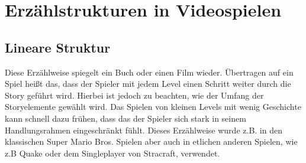 %
%
%
%
%
%
%
%
%
%
%
%
%
%
%
\section{Erzählstrukturen in Videospielen} 
 

\subsection{Lineare Struktur} 

Diese Erzählweise spiegelt ein Buch oder einen Film wieder. Übertragen auf ein Spiel heißt das, dass der Spieler mit jedem Level einen Schritt weiter durch die Story geführt wird. Hierbei ist jedoch zu beachten, wie der Umfang der Storyelemente gewählt wird. Das Spielen von kleinen Levels mit wenig Geschichte kann schnell dazu frühen, dass das der Spieler sich stark in seinem Handlungsrahmen eingeschränkt fühlt.  Dieses Erzählweise wurde z.B. in den klassischen Super Mario Bros. Spielen aber auch in etlichen anderen Spielen, wie z.B Quake oder dem Singleplayer von Stracraft, verwendet.


